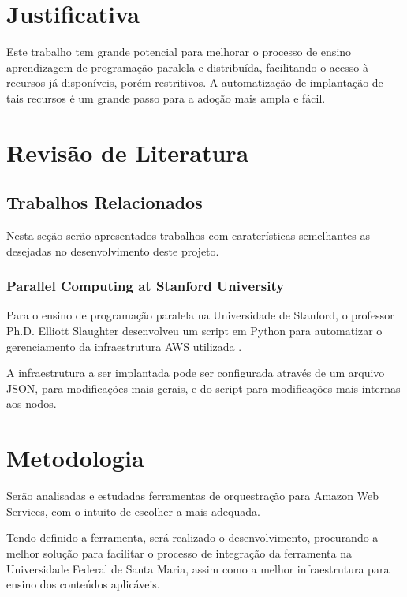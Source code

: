 \documentclass[12pt]{article}
\begin{document}
\section{Justificativa}
Este trabalho tem grande potencial para melhorar o processo de ensino aprendizagem de programação paralela e distribuída, facilitando o acesso à recursos já disponíveis, porém restritivos. A automatização de implantação de tais recursos é um grande passo para a adoção mais ampla e fácil.


\section{Revisão de Literatura}

\subsection{Trabalhos Relacionados}
Nesta seção serão apresentados trabalhos com caraterísticas semelhantes as desejadas no desenvolvimento deste projeto.

\subsubsection{Parallel Computing at Stanford University}
Para o ensino de programação paralela na Universidade de Stanford, o professor Ph.D. Elliott Slaughter desenvolveu um script em Python para automatizar o gerenciamento da infraestrutura AWS utilizada \cite{stanford}.

A infraestrutura a ser implantada pode ser configurada através de um arquivo JSON, para modificações mais gerais, e do script para modificações mais internas aos nodos.

\section{Metodologia}
Serão analisadas e estudadas ferramentas de orquestração para Amazon Web Services, com o intuito de escolher a mais adequada.

Tendo definido a ferramenta, será realizado o desenvolvimento, procurando a melhor solução para facilitar o processo de integração da ferramenta na Universidade Federal de Santa Maria, assim como a melhor infraestrutura para ensino dos conteúdos aplicáveis.
\end{document}
